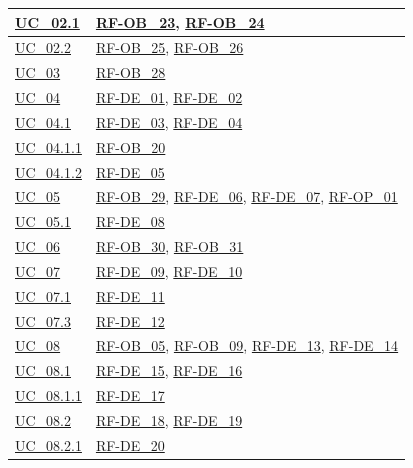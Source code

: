 \begin{longtable}{|
        >{\raggedright\arraybackslash}p{} |
        >{\raggedright\arraybackslash}p{} |
    }
    \hline
    \hyperref[uc_02.1]{UC\_02.1} & \hyperlink{rf-ob_23}{RF-OB\_23}, \hyperlink{rf-ob_24}{RF-OB\_24} \\
    \hline
    \hyperref[uc_02.2]{UC\_02.2} & \hyperlink{rf-ob_25}{RF-OB\_25}, \hyperlink{rf-ob_26}{RF-OB\_26} \\
    \hline
    \hyperref[uc_03]{UC\_03} & \hyperlink{rf-ob_28}{RF-OB\_28} \\
    \hline
    \hyperref[uc_04]{UC\_04} & \hyperlink{rf-de_1}{RF-DE\_01}, \hyperlink{rf-de_2}{RF-DE\_02} \\
    \hline
    \hyperref[uc_04.1]{UC\_04.1} & \hyperlink{rf-de_3}{RF-DE\_03}, \hyperlink{rf-de_4}{RF-DE\_04} \\
    \hline
    \hyperref[uc_04.1.1]{UC\_04.1.1} & \hyperlink{rf-ob_20}{RF-OB\_20} \\
    \hline
    \hyperref[uc_04.1.2]{UC\_04.1.2} & \hyperlink{rf-de_5}{RF-DE\_05} \\
    \hline
    \hyperref[uc_05]{UC\_05} & \hyperlink{rf-ob_29}{RF-OB\_29}, \hyperlink{rf-de_6}{RF-DE\_06}, \hyperlink{rf-de_7}{RF-DE\_07}, \hyperlink{rf-op_1}{RF-OP\_01} \\
    \hline
    \hyperref[uc_05.1]{UC\_05.1} & \hyperlink{rf-de_8}{RF-DE\_08} \\
    \hline
    \hyperref[uc_06]{UC\_06} & \hyperlink{rf-ob_30}{RF-OB\_30}, \hyperlink{rf-ob_31}{RF-OB\_31} \\
    \hline
    \hyperref[uc_07]{UC\_07} & \hyperlink{rf-de_9}{RF-DE\_09}, \hyperlink{rf-de_10}{RF-DE\_10} \\
    \hline
    \hyperref[uc_07.1]{UC\_07.1} & \hyperlink{rf-de_11}{RF-DE\_11} \\
    \hline
    \hyperref[uc_07.3]{UC\_07.3} & \hyperlink{rf-de_12}{RF-DE\_12} \\
    \hline
    \hyperref[uc_08]{UC\_08} & \hyperlink{rf-ob_5}{RF-OB\_05}, \hyperlink{rf-ob_9}{RF-OB\_09}, \hyperlink{rf-de_13}{RF-DE\_13}, \hyperlink{rf-de_14}{RF-DE\_14} \\
    \hline
    \hyperref[uc_08.1]{UC\_08.1} & \hyperlink{rf-de_15}{RF-DE\_15}, \hyperlink{rf-de_16}{RF-DE\_16} \\
    \hline
    \hyperref[uc_08.1.1]{UC\_08.1.1} & \hyperlink{rf-de_17}{RF-DE\_17} \\
    \hline
    \hyperref[uc_08.2]{UC\_08.2} & \hyperlink{rf-de_18}{RF-DE\_18}, \hyperlink{rf-de_19}{RF-DE\_19} \\
    \hline
    \hyperref[uc_08.2.1]{UC\_08.2.1} & \hyperlink{rf-de_20}{RF-DE\_20} \\

\end{longtable}

